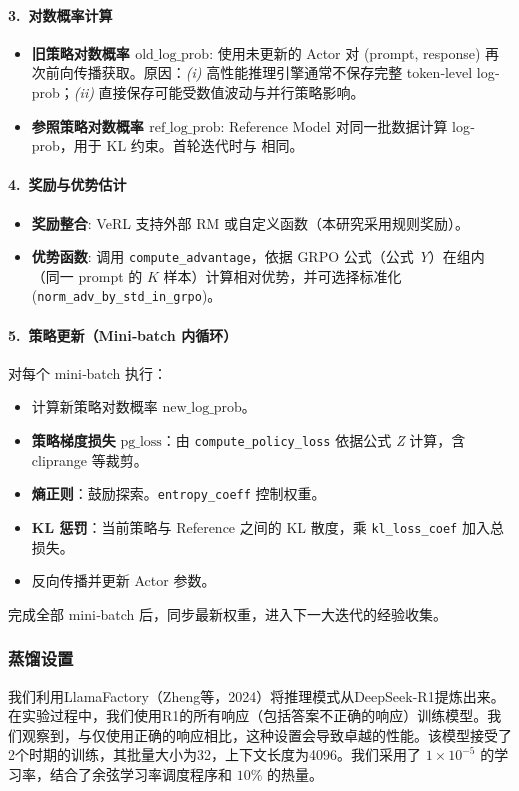 \documentclass{pkuthesis}
\begin{document}
\paragraph{3.\ 对数概率计算}
\begin{itemize}
    \item \textbf{旧策略对数概率 $\text{old\_log\_prob}$}: 使用未更新的 Actor 对 (prompt, response) 再次前向传播获取。原因：\textit{(i)} 高性能推理引擎通常不保存完整 token‐level log‐prob；\textit{(ii)} 直接保存可能受数值波动与并行策略影响。
    \item \textbf{参照策略对数概率 $\text{ref\_log\_prob}$}: Reference Model 对同一批数据计算 log‐prob，用于 KL 约束。首轮迭代时与  相同。
\end{itemize}

\paragraph{4.\ 奖励与优势估计}
\begin{itemize}
    \item \textbf{奖励整合}: VeRL 支持外部 RM 或自定义函数（本研究采用规则奖励）。
    \item \textbf{优势函数}: 调用 \texttt{compute\_advantage}，依据 GRPO 公式（公式 \textit{Y}）在组内（同一 prompt 的 $K$ 样本）计算相对优势，并可选择标准化 (\texttt{norm\_adv\_by\_std\_in\_grpo})。
\end{itemize}

\paragraph{5.\ 策略更新（Mini‐batch 内循环）}
对每个 mini‐batch 执行：
\begin{itemize}
    \item 计算新策略对数概率 $\text{new\_log\_prob}$。
    \item \textbf{策略梯度损失} $\text{pg\_loss}$：由 \texttt{compute\_policy\_loss} 依据公式 \textit{Z} 计算，含 cliprange 等裁剪。
    \item \textbf{熵正则}：鼓励探索。\texttt{entropy\_coeff} 控制权重。
    \item \textbf{KL 惩罚}：当前策略与 Reference 之间的 KL 散度，乘 \texttt{kl\_loss\_coef} 加入总损失。
    \item 反向传播并更新 Actor 参数。
\end{itemize}
完成全部 mini‐batch 后，同步最新权重，进入下一大迭代的经验收集。

\subsubsection{蒸馏设置}
我们利用LlamaFactory（Zheng等，2024）将推理模式从DeepSeek-R1提炼出来。在实验过程中，我们使用R1的所有响应（包括答案不正确的响应）训练模型。我们观察到，与仅使用正确的响应相比，这种设置会导致卓越的性能。该模型接受了2个时期的训练，其批量大小为32，上下文长度为4096。我们采用了 $1 \times 10^{-5}$ 的学习率，结合了余弦学习率调度程序和 $10\%$ 的热量。
\end{document}
